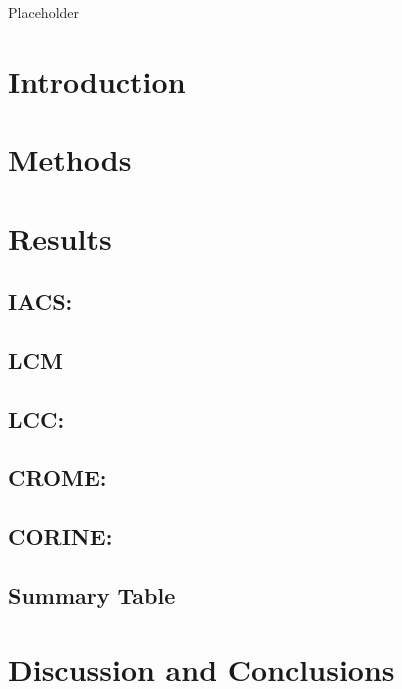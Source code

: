 \documentclass[
]{book}
\begin{document}
Placeholder

\hypertarget{introduction-3}{%
\section{Introduction}\label{introduction-3}}

\hypertarget{methods-2}{%
\section{Methods}\label{methods-2}}

\hypertarget{results-2}{%
\section{Results}\label{results-2}}

\hypertarget{iacs}{%
\subsection{IACS:}\label{iacs}}

\hypertarget{lcm}{%
\subsection{LCM}\label{lcm}}

\hypertarget{lcc}{%
\subsection{LCC:}\label{lcc}}

\hypertarget{crome}{%
\subsection{CROME:}\label{crome}}

\hypertarget{corine}{%
\subsection{CORINE:}\label{corine}}

\hypertarget{summary-table}{%
\subsection{Summary Table}\label{summary-table}}

\hypertarget{discussion-and-conclusions}{%
\section{Discussion and Conclusions}\label{discussion-and-conclusions}}
\end{document}
